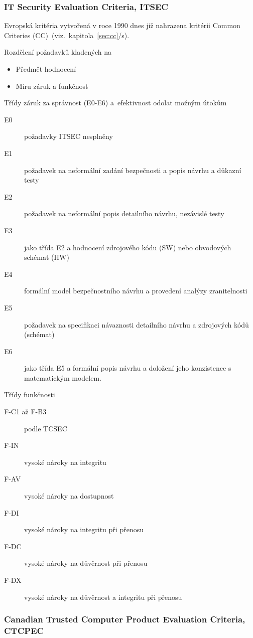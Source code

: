 \documentclass[a4paper,12pt]{article}
\newcommand{\odkazNaKapitolu}[1]{(viz.~kapitola~\ref{#1}/s\pageref{#1})}
\begin{document}
\subsubsection{IT Security Evaluation Criteria, ITSEC}\label{sec:ITSEC}

Evropská kritéria vytvořená v roce 1990 dnes již nahrazena kritérii Common Criteries (CC)~\odkazNaKapitolu{sec:cc}.

Rozdělení požadavků kladených na
\begin{itemize}
 \item Předmět hodnocení
 \item Míru záruk a funkčnost
\end{itemize}
Třídy záruk za správnost (E0-E6) a~efektivnost odolat možným útokům~\cite{PrezentaceBIS}
\begin{description}
 \item[E0] požadavky ITSEC nesplněny
 \item[E1] požadavek na neformální zadání bezpečnosti a popis návrhu a důkazní testy
 \item[E2] požadavek na neformální popis detailního návrhu, nezávislé testy
 \item[E3] jako třída E2 a hodnocení zdrojového kódu (SW) nebo obvodových schémat (HW)
 \item[E4] formální model bezpečnostního návrhu a provedení analýzy zranitelnosti
 \item[E5] požadavek na specifikaci návaznosti detailního návrhu a zdrojových kódů (schémat)
 \item[E6] jako třída E5 a formální popis návrhu a doložení jeho konzistence s matematickým modelem. 
\end{description}

Třídy funkčnosti~\cite{PrezentaceBIS}
\begin{description}
\item[F-C1 až F-B3] podle TCSEC 
\item[F-IN] vysoké nároky na integritu
\item[F-AV] vysoké nároky na dostupnost
\item[F-DI] vysoké nároky na integritu při přenosu
\item[F-DC] vysoké nároky na důvěrnost při přenosu
\item[F-DX] vysoké nároky na důvěrnost a integritu při přenosu
\end{description}

\subsubsection{Canadian Trusted Computer Product Evaluation Criteria, CTCPEC}\label{sec:CTCPEC}
\end{document}
